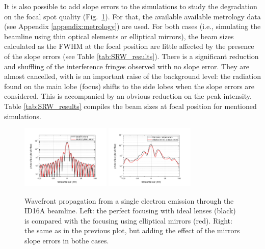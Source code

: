 \documentclass{iucr}              %
\begin{document}
It is also possible to add slope errors to the simulations to study the degradation on the focal spot quality (Fig.~\ref{fig:SingleElectron}). For that, the available available metrology data (see Appendix \ref{appendix:metrology})  are used. For both cases (i.e., simulating the beamline using thin optical elements or elliptical mirrors), the beam sizes calculated as the FWHM at the focal position are little affected by the presence of the slope errors (see Table \ref{tab:SRW_results}). There is a significant reduction and shuffling of the interference fringes observed with no slope error. They are almost cancelled, with is an important raise of the background level: the radiation found on the main lobe (focus) shifts to the side lobes when the slope errors are considered. This is accompanied by an obvious reduction on the peak intensity. Table \ref{tab:SRW_results} compiles the beam sizes at focal position for mentioned simulations.

\begin{figure}
    \centering
        \includegraphics[width=4.25cm]{GRAPHICS/se_idealTE_idealOE_h.pdf}
        \includegraphics[width=4.25cm]{GRAPHICS/ebs_slopeTE_slopeOE_h.pdf}
    \label{fig:SingleElectron}
    \caption{Wavefront propagation from a single electron emission through the ID16A beamline. Left: the perfect focusing with ideal lenses (black) is compared with the focusing using elliptical mirrors (red). Right: the same as in the previous plot, but adding the effect of the mirrors slope errors in bothe cases.}
\end{figure}
\end{document}
